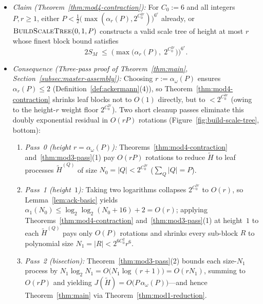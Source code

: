 \documentclass[11pt]{article}
\theoremstyle{definition}
\theoremstyle{remark}
\newcommand{\BuildScaleTree}{\textnormal{\scshape BuildScaleTree}}
\begin{document}
\begin{itemize}[leftmargin=2em, itemsep=2pt]
  \item \emph{Claim (Theorem~\ref{thm:mod4-contraction}):} For $C_0 := 6$ and all integers $P, r \ge 1$, either $P < \frac{1}{2}\big(\max(\alpha_r(P), 2^{C_0^{2r}})\big)^{6^r}$ already, or $\BuildScaleTree(0, 1, P)$ constructs a valid scale tree of height at most $r$ whose finest block bound satisfies
  \[
  2 S_M \;\le\; \Big(\max\big(\alpha_r(P),\; 2^{C_0^{2r}}\big)\Big)^{6^r}.
  \]
  \item \emph{Consequence (Three-pass proof of Theorem~\ref{thm:main}, Section~\ref{subsec:master-assembly}):} Choosing $r := \alpha_\omega(P)$ ensures $\alpha_r(P) \le 2$ (Definition~\ref{def:ackermann}(4)), so Theorem~\ref{thm:mod4-contraction} shrinks leaf blocks not to $O(1)$ directly, but to $< 2^{C_0^{3r}}$ (owing to the height-$r$ weight floor $2^{C_0^{2r}}$). Two short cleanup passes eliminate this doubly exponential residual in $O(r P)$ rotations (Figure~\ref{fig:build-scale-tree}, bottom):
  \begin{enumerate}[label=\arabic*., leftmargin=1.5em, itemsep=1pt]
    \item \emph{Pass~0 (height $r = \alpha_\omega(P)$):} Theorems~\ref{thm:mod4-contraction} and~\ref{thm:mod3-pass}(1) pay $O(r P)$ rotations to reduce $\widetilde{H}$ to leaf processes $\widetilde{H}^{(Q)}$ of size $N_0 = |Q| < 2^{C_0^{3r}}$ ($\sum_Q |Q| = P$).
    \item \emph{Pass~1 (height~$1$):} Taking two logarithms collapses $2^{C_0^{3r}}$ to $O(r)$, so Lemma~\ref{lem:ack-basic} yields $\alpha_1(N_0) \le \log_2\log_2(N_0 + 16) + 2 = O(r)$; applying Theorems~\ref{thm:mod4-contraction} and~\ref{thm:mod3-pass}(1) at height~$1$ to each $\widetilde{H}^{(Q)}$ pays only $O(P)$ rotations and shrinks every sub-block $R$ to polynomial size $N_1 = |R| < 2^{6 C_0^2} r^6$.
    \item \emph{Pass~2 (bisection):} Theorem~\ref{thm:mod3-pass}(2) bounds each size-$N_1$ process by $N_1 \log_2 N_1 = O\big(N_1 \log(r + 1)\big) = O(r N_1)$, summing to $O(r P)$ and yielding $J(\widetilde{H}) = O\big(P\,\alpha_\omega(P)\big)$---and hence Theorem~\ref{thm:main} via Theorem~\ref{thm:mod1-reduction}.
  \end{enumerate}
\end{itemize}
\end{document}
